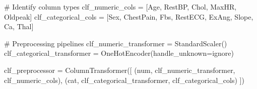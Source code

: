 \documentclass[
  letterpaper,
  DIV=11,
  numbers=noendperiod]{scrreprt}
\newenvironment{Shaded}{\begin{snugshade}}{\end{snugshade}}
\newcommand{\CommentTok}[1]{\textcolor[rgb]{0.37,0.37,0.37}{#1}}
\newcommand{\NormalTok}[1]{\textcolor[rgb]{0.00,0.23,0.31}{#1}}
\newcommand{\OperatorTok}[1]{\textcolor[rgb]{0.37,0.37,0.37}{#1}}
\newcommand{\StringTok}[1]{\textcolor[rgb]{0.13,0.47,0.30}{#1}}
\begin{document}
\begin{Shaded}
\begin{Highlighting}[]
\CommentTok{\# Identify column types}
\NormalTok{clf\_numeric\_cols }\OperatorTok{=}\NormalTok{ [}\StringTok{\textquotesingle{}Age\textquotesingle{}}\NormalTok{, }\StringTok{\textquotesingle{}RestBP\textquotesingle{}}\NormalTok{, }\StringTok{\textquotesingle{}Chol\textquotesingle{}}\NormalTok{, }\StringTok{\textquotesingle{}MaxHR\textquotesingle{}}\NormalTok{, }\StringTok{\textquotesingle{}Oldpeak\textquotesingle{}}\NormalTok{]}
\NormalTok{clf\_categorical\_cols }\OperatorTok{=}\NormalTok{ [}\StringTok{\textquotesingle{}Sex\textquotesingle{}}\NormalTok{, }\StringTok{\textquotesingle{}ChestPain\textquotesingle{}}\NormalTok{, }\StringTok{\textquotesingle{}Fbs\textquotesingle{}}\NormalTok{, }\StringTok{\textquotesingle{}RestECG\textquotesingle{}}\NormalTok{, }\StringTok{\textquotesingle{}ExAng\textquotesingle{}}\NormalTok{, }\StringTok{\textquotesingle{}Slope\textquotesingle{}}\NormalTok{, }\StringTok{\textquotesingle{}Ca\textquotesingle{}}\NormalTok{, }\StringTok{\textquotesingle{}Thal\textquotesingle{}}\NormalTok{]}

\CommentTok{\# Preprocessing pipelines}
\NormalTok{clf\_numeric\_transformer }\OperatorTok{=}\NormalTok{ StandardScaler()}
\NormalTok{clf\_categorical\_transformer }\OperatorTok{=}\NormalTok{ OneHotEncoder(handle\_unknown}\OperatorTok{=}\StringTok{\textquotesingle{}ignore\textquotesingle{}}\NormalTok{)}

\NormalTok{clf\_preprocessor }\OperatorTok{=}\NormalTok{ ColumnTransformer([}
\NormalTok{    (}\StringTok{\textquotesingle{}num\textquotesingle{}}\NormalTok{, clf\_numeric\_transformer, clf\_numeric\_cols),}
\NormalTok{    (}\StringTok{\textquotesingle{}cat\textquotesingle{}}\NormalTok{, clf\_categorical\_transformer, clf\_categorical\_cols)}
\NormalTok{])}
\end{Highlighting}
\end{Shaded}
\end{document}
